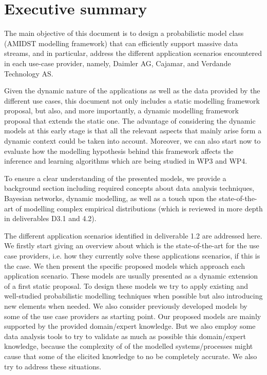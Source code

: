 \section{Executive summary}\label{section:executiveSummary}

The main objective of this document is to design a probabilistic model class (AMIDST modelling framework) that can efficiently support massive data streams, and in particular, address the different application scenarios encountered in each use-case provider, namely, Daimler AG, Cajamar, and Verdande Technology AS. 

Given the dynamic nature of the applications as well as the data provided by the different use cases, this document not only includes a static modelling framework proposal, but also, and more importantly, a dynamic modelling framework proposal that extends the static one. The advantage of considering the dynamic models at this early stage is that all the relevant aspects that mainly arise form a dynamic context could be taken into account. Moreover, we can also start now to evaluate how the modelling hypothesis behind this framework affects the inference and learning algorithms which are being studied in WP3 and WP4. 


To ensure a clear understanding of the presented models, we  provide a background section including required concepts about data analysis techniques, Bayesian networks, dynamic modelling, as well as a touch upon the state-of-the-art of modelling complex empirical distributions (which is reviewed in more depth in deliverables D3.1 and 4.2).

The different application scenarios identified in deliverable 1.2 are addressed here. We firstly start giving an overview about which is the state-of-the-art for the use case providers, i.e. how they currently solve these applications scenarios, if this is the case. We then present the specific proposed models which approach each application scenario. These models are usually presented as a dynamic extension of a first static proposal. To design these models we try to apply existing and well-studied probabilistic modelling techniques when possible but also introducing new elements when needed. We also consider previously developed models by some of the use case providers as starting point. Our proposed models are mainly supported by the provided domain/expert knowledge. But we also employ some data analysis tools to try to validate as much as possible this domain/expert knowledge, because the complexity of of the modelled systems/processes might cause that some of the elicited knowledge to no be completely accurate. We also try to address these situations. 

